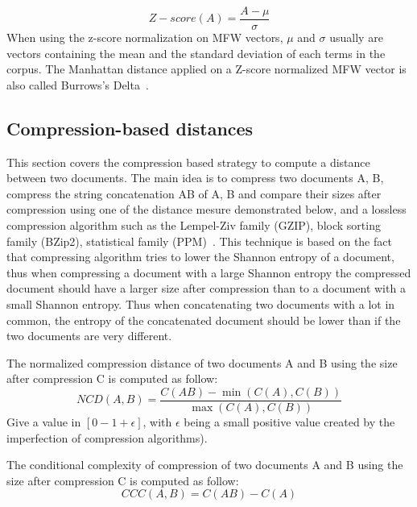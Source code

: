 \begin{definition}
  \begin{equation}
    Z-score(A) = \frac{A - \mu}{\sigma}
  \end{equation}
  When using the z-score normalization on MFW vectors, $\mu$ and $\sigma$ usually are vectors containing the mean and the standard deviation of each terms in the corpus.
  The Manhattan distance applied on a Z-score normalized MFW vector is also called Burrows's Delta~\cite{savoy_stylo}.
\end{definition}

\subsection{Compression-based distances}

This section covers the compression based strategy to compute a distance between two documents.
The main idea is to compress two documents A, B, compress the string concatenation AB of A, B and compare their sizes after compression using one of the distance mesure demonstrated below, and a lossless compression algorithm such as the Lempel-Ziv family (GZIP), block sorting family (BZip2), statistical family (PPM)~\cite{comparing_compression}.
This technique is based on the fact that compressing algorithm tries to lower the Shannon entropy of a document, thus when compressing a document with a large Shannon entropy the compressed document should have a larger size after compression than to a document with a small Shannon entropy.
Thus when concatenating two documents with a lot in common, the entropy of the concatenated document should be lower than if the two documents are very different.

\begin{definition}
  The normalized compression distance of two documents A and B using the size after compression C is computed as follow:
  \begin{equation}
    NCD(A, B) = \frac{C(AB) - \min(C(A), C(B))}{\max(C(A), C(B))}
  \end{equation}
  Give a value in $\left[0-1+\epsilon\right]$, with $\epsilon$ being a small positive value created by the imperfection of compression algorithms).
\end{definition}

\begin{definition}
  The conditional complexity of compression of two documents A and B using the size after compression C is computed as follow:
  \begin{equation}
    CCC(A, B) = C(AB) - C(A)
  \end{equation}

\end{definition}

